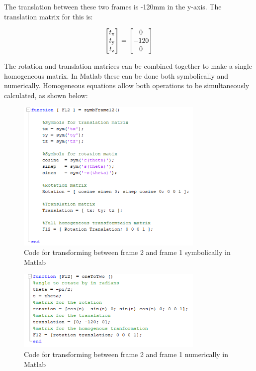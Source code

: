 \documentclass [11pt]{report}
\begin{document}
The translation between these two frames is -120mm in the y-axis. The translation matrix for this is:

\begin{equation*}
\begin{bmatrix}
t\textsubscript{x}\\
t\textsubscript{y}\\
t\textsubscript{z}\\
\end{bmatrix}
=
\begin{bmatrix}
0\\
-120\\
0\\
\end{bmatrix}
\end{equation*}

The rotation and translation matrices can be combined together to make a single homogeneous matrix. In Matlab these can be done both symbolically and numerically. Homogeneous equations allow both operations to be simultaneously calculated, as shown below:

\begin{figure}[H]
\centerline{\includegraphics[width=9cm]{symbFrame12.png}}
\caption{Code for transforming between frame 2 and frame 1 symbolically in Matlab}
\label{fig}
\end{figure}

\begin{figure}[H]
\centerline{\includegraphics[width=9cm]{oneToTwocode.png}}
\caption{Code for transforming between frame 2 and frame 1 numerically in Matlab}
\label{fig}
\end{figure}
\end{document}
